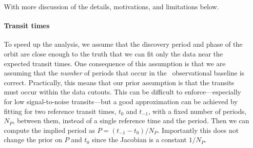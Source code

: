 \documentclass[modern]{aastex63}
\begin{document}
With more discussion of the details, motivations, and limitations below.

\paragraph{Transit times}
To speed up the analysis, we assume that the discovery period and phase of the orbit are close enough to the truth that we can fit only the data near the expected transit times.
One consequence of this assumption is that we are assuming that the \emph{number} of periods that occur in the \tess\ observational baseline is correct.
Practically, this means that our prior assumption is that the transits must occur within the data cutouts.
This can be difficult to enforce---especially for low signal-to-noise transits---but a good approximation can be achieved by fitting for two reference transit times, $t_0$ and $t_{-1}$, with a fixed number of periods, $N_P$, between them, instead of a single reference time and the period.
Then we can compute the implied period as $P = (t_{-1} - t_0) / N_P$.
Importantly this does not change the prior on $P$ and $t_0$ since the Jacobian is a constant $1/N_P$.
\end{document}
